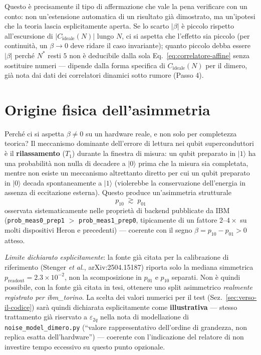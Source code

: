 \documentclass[11pt,a4paper]{article}
\newcommand{\ket}[1]{\lvert #1 \rangle}
\begin{document}
\begin{center}
\end{center}

Questo è precisamente il tipo di affermazione che vale la pena
verificare con un conto: non un'estensione automatica di un risultato
già dimostrato, ma un'ipotesi che la teoria lascia esplicitamente aperta.
Se lo scarto $|\beta|$ è piccolo rispetto all'escursione di $|C_\text{ideale}(N)|$
lungo $N$, ci si aspetta che l'effetto sia piccolo (per continuità, un
$\beta\to0$ deve ridare il caso invariante); quanto piccolo debba essere
$|\beta|$ perché $N^*$ resti $5$ non è deducibile dalla sola
Eq.~\eqref{eq:correlatore-affine} senza sostituire numeri --- dipende
dalla forma specifica di $C_\text{ideale}(N)$ per il dimero, già nota
dai dati dei correlatori dinamici sotto rumore (Passo 4).

\section{Origine fisica dell'asimmetria}
\label{sec:origine-fisica}

Perché ci si aspetta $\beta\neq0$ su un hardware reale, e non solo per
completezza teorica? Il meccanismo dominante dell'errore di lettura nei
qubit superconduttori è il \textbf{rilassamento} ($T_1$) durante la
finestra di misura: un qubit preparato in $\ket1$ ha una probabilità non
nulla di decadere a $\ket0$ prima che la misura sia completata, mentre
non esiste un meccanismo altrettanto diretto per cui un qubit preparato
in $\ket0$ decada spontaneamente a $\ket1$ (violerebbe la conservazione
dell'energia in assenza di eccitazione esterna). Questo produce
un'asimmetria strutturale
\begin{equation}
p_{10} \;{\gtrsim}\; p_{01}
\end{equation}
osservata sistematicamente nelle proprietà di backend pubblicate da IBM
(\texttt{prob\_meas0\_prep1} $>$ \texttt{prob\_meas1\_prep0}, tipicamente
di un fattore $2$--$4\times$ su molti dispositivi Heron e precedenti) ---
coerente con il segno $\beta=p_{10}-p_{01}>0$ atteso.

\emph{Limite dichiarato esplicitamente}: la fonte già citata per la
calibrazione di riferimento (Stenger \emph{et al.}, arXiv:2504.15187)
riporta solo la mediana simmetrica $p_\text{readout}=2.3\times10^{-2}$,
non la scomposizione in $p_{01}$ e $p_{10}$ separati. Non è quindi
possibile, con la fonte già citata in tesi, ottenere uno split
asimmetrico \emph{realmente registrato per ibm\_torino}. La scelta dei
valori numerici per il test (Sez.~\ref{sec:verso-il-codice}) sarà quindi
dichiarata esplicitamente come \textbf{illustrativa} --- stesso trattamento
già riservato a $\varepsilon_{2q}$ nella nota di modellazione di
\texttt{noise\_model\_dimero.py} (``valore rappresentativo dell'ordine di
grandezza, non replica esatta dell'hardware'') --- coerente con
l'indicazione del relatore di non investire tempo eccessivo su questo
punto opzionale.
\end{document}
